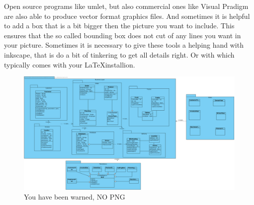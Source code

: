 Open source programs like umlet, but also commercial ones like Visual Pradigm are also able to produce
vector format graphics files. And sometimes it is helpful to add a box
that is a bit bigger then the picture you want to include.
This ensures that the so called bounding box does not cut of any lines
you want in your picture. Sometimes it is necessary to give these
tools a helping hand with inkscape, that is do a bit of tinkering to
get all details right. Or with  which typically comes with your \LaTeX installion.


\begin{figure}[htbp]
  \includegraphics[width=\linewidth]{images/ClassDiagram1.png}
  \caption{You have been warned, NO PNG}
\end{figure}

